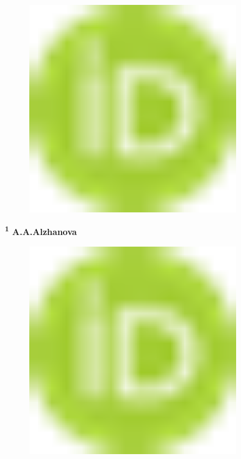 \begin{figure}[H]
	\centering
	\includegraphics[width=0.8\textwidth]{media/ekon/image1}
	\caption*{}
\end{figure}


{\bfseries \textsuperscript{1} A.A.Alzhanova}
\begin{figure}[H]
	\centering
	\includegraphics[width=0.8\textwidth]{media/ekon/image1}
	\caption*{}
\end{figure}

